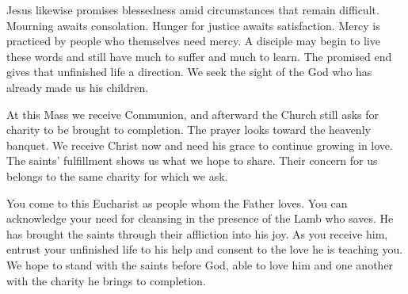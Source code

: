 Jesus likewise promises blessedness amid circumstances that remain difficult. Mourning awaits consolation. Hunger for justice awaits satisfaction. Mercy is practiced by people who themselves need mercy. A disciple may begin to live these words and still have much to suffer and much to learn. The promised end gives that unfinished life a direction. We seek the sight of the God who has already made us his children.

At this Mass we receive Communion, and afterward the Church still asks for charity to be brought to completion. The prayer looks toward the heavenly banquet. We receive Christ now and need his grace to continue growing in love. The saints' fulfillment shows us what we hope to share. Their concern for us belongs to the same charity for which we ask.

You come to this Eucharist as people whom the Father loves. You can acknowledge your need for cleansing in the presence of the Lamb who saves. He has brought the saints through their affliction into his joy. As you receive him, entrust your unfinished life to his help and consent to the love he is teaching you. We hope to stand with the saints before God, able to love him and one another with the charity he brings to completion.

